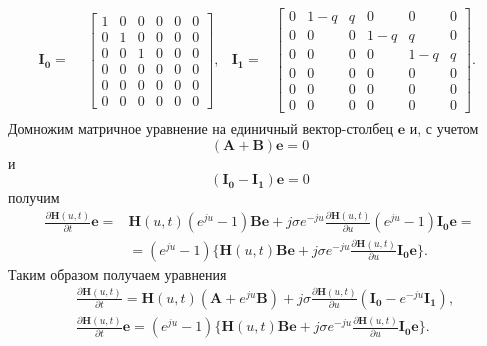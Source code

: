 \begin{gather*}
	\boldsymbol{I_{0}}=
	\!\begin{aligned}
		&
		\left[\begin{matrix}1 & 0 & 0 & 0 & 0 & 0\\0 & 1 & 0 & 0 & 0 & 0\\0 & 0 & 1 & 0 & 0 & 0\\0 & 0 & 0 & 0 & 0 & 0\\0 & 0 & 0 & 0 & 0 & 0\\0 & 0 & 0 & 0 & 0 & 0\end{matrix}\right],
		&
		\boldsymbol{I_{1}}=
		&
		\left[\begin{matrix}0 & 1 - q & q & 0 & 0 & 0\\0 & 0 & 0 & 1 - q & q & 0\\0 & 0 & 0 & 0 & 1 - q & q\\0 & 0 & 0 & 0 & 0 & 0\\0 & 0 & 0 & 0 & 0 & 0\\0 & 0 & 0 & 0 & 0 & 0\end{matrix}\right].
	\end{aligned}
\end{gather*}
Домножим матричное уравнение на единичный вектор-столбец $\boldsymbol{e}$ и, с учетом $$(\boldsymbol{A} + \boldsymbol{B}) \boldsymbol{e} = 0$$ и $$(\boldsymbol{I_{0}} - \boldsymbol{I_{1}}) \boldsymbol{e} = 0$$ получим
\begin{align*}
	\frac{\partial \boldsymbol{H}(u,t)}{\partial t}\boldsymbol{e}=&\boldsymbol{H}(u,t)(e^{ju}-1)\boldsymbol{B}\boldsymbol{e}+j\sigma e^{-ju}\frac{\partial \boldsymbol{H}(u,t)}{\partial u}(e^{ju}-1)\boldsymbol{I_{0}}\boldsymbol{e}=\\
	&=(e^{ju}-1)\{\boldsymbol{H}(u,t)\boldsymbol{B}\boldsymbol{e}+j\sigma e^{-ju}\frac{\partial \boldsymbol{H}(u,t)}{\partial u}\boldsymbol{I_{0}} \boldsymbol{e}\}.
\end{align*} 
Таким образом получаем уравнения
\begin{equation}
	\begin{split}
		&\frac{\partial \boldsymbol{H}(u,t)}{\partial t}=\boldsymbol{H}(u,t)(\boldsymbol{A}+e^{ju}\boldsymbol{B})+j\sigma\frac{\partial \boldsymbol{H}(u,t)}{\partial u}(\boldsymbol{I_{0}}-e^{-ju}\boldsymbol{I_{1}}),\\
		&\frac{\partial \boldsymbol{H}(u,t)}{\partial t} \boldsymbol{e}=(e^{ju}-1)\{\boldsymbol{H}(u,t)\boldsymbol{B} \boldsymbol{e}+j\sigma e^{-ju}\frac{\partial \boldsymbol{H}(u,t)}{\partial u}\boldsymbol{I_{0}} \boldsymbol{e}\}.
	\end{split}
\end{equation}
\newpage
